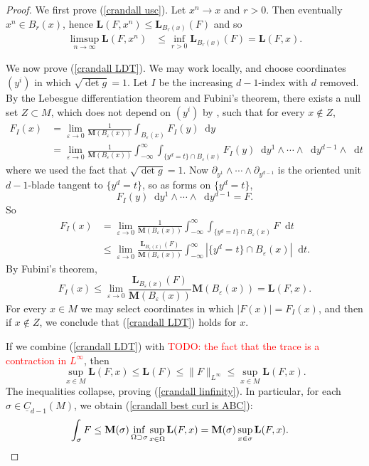 \documentclass[reqno,11pt]{amsart}
\newcommand*\dif{\mathop{}\!\mathrm{d}}
\newcommand{\Chain}{\underline C}
\newcommand{\Mass}{\mathbf M}
\newcommand{\Comass}{\mathbf L}
\theoremstyle{definition}
\numberwithin{equation}{section}
\newcommand\todo[1]{\textcolor{red}{TODO: #1}}
\begin{document}
\begin{proof}
We first prove (\ref{crandall usc}).
Let $x^n \to x$ and $r > 0$. Then eventually $x^n \in B_r(x)$, hence $\Comass(F, x^n) \leq \Comass_{B_r(x)}(F)$ and so
\begin{align*}
\limsup_{n \to \infty} \Comass(F, x^n) &\leq \inf_{r > 0} \Comass_{B_r(x)}(F) = \Comass(F, x).
\end{align*}

We now prove (\ref{crandall LDT}).
We may work locally, and choose coordinates $(y^i)$ in which $\sqrt{\det g} = 1$.
Let $I$ be the increasing $d-1$-index with $d$ removed.
By the Lebesgue differentiation theorem and Fubini's theorem, there exists a null set $Z \subset M$, which does not depend on $(y^i)$ by \cite[Proposition 2.1]{BackusFLG}, such that for every $x \notin Z$,
\begin{align*}
F_I(x) 
&= \lim_{\varepsilon \to 0} \frac{1}{\Mass(B_\varepsilon(x))} \int_{B_\varepsilon(x)} F_I(y) \dif y \\
&= \lim_{\varepsilon \to 0} \frac{1}{\Mass(B_\varepsilon(x))} \int_{-\infty}^\infty \int_{\{y^d = t\} \cap B_\varepsilon(x)} F_I(y) \dif y^1 \wedge \cdots \wedge \dif y^{d - 1} \wedge \dif t
\end{align*}
where we used the fact that $\sqrt{\det g} = 1$.
Now $\partial_{y^1} \wedge \cdots \wedge \partial_{y^{d - 1}}$ is the oriented unit $d - 1$-blade tangent to $\{y^d = t\}$, so as forms on $\{y^d = t\}$,
$$F_I(y) \dif y^1 \wedge \cdots \wedge \dif y^{d - 1} = F.$$
So
\begin{align*}
F_I(x) 
&= \lim_{\varepsilon \to 0} \frac{1}{\Mass(B_\varepsilon(x))} \int_{-\infty}^\infty \int_{\{y^d = t\} \cap B_\varepsilon(x)} F \dif t \\
&\leq \lim_{\varepsilon \to 0} \frac{\Comass_{B_\varepsilon(x)}(F)}{\Mass(B_\varepsilon(x))} \int_{-\infty}^\infty |\{y^d = t\} \cap B_\varepsilon(x)| \dif t.
\end{align*}
By Fubini's theorem,
$$F_I(x) \leq \lim_{\varepsilon \to 0} \frac{\Comass_{B_\varepsilon(x)}(F)}{\Mass(B_\varepsilon(x))} \Mass(B_\varepsilon(x)) = \Comass(F, x).$$
For every $x \in M$ we may select coordinates in which $|F(x)| = F_I(x)$, and then if $x \notin Z$, we conclude that (\ref{crandall LDT}) holds for $x$.

If we combine (\ref{crandall LDT}) with \todo{the fact that the trace is a contraction in $L^\infty$}, then
$$\sup_{x \in M} \Comass(F, x) \leq \Comass(F) \leq \|F\|_{L^\infty} \leq \sup_{x \in M} \Comass(F, x).$$
The inequalities collapse, proving (\ref{crandall linfinity}).
In particular, for each $\sigma \in \Chain_{d - 1}(M)$, we obtain (\ref{crandall best curl is ABC}):
\begin{align*}
\int_\sigma F &\leq \Mass(\sigma) \inf_{\Omega \supset \sigma} \sup_{x \in \Omega} \Comass(F, x) = \Mass(\sigma) \sup_{x \in \sigma} \Comass(F, x). \qedhere
\end{align*}
\end{proof}
\end{document}

